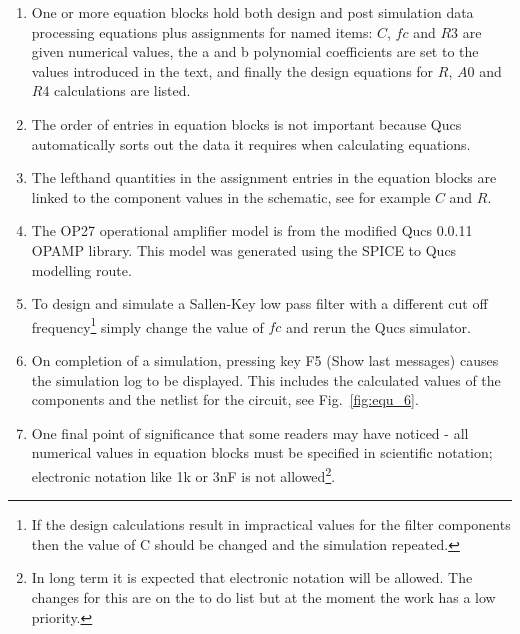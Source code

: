 \begin{enumerate}
  \item One or more equation blocks hold both design and post
  simulation data processing equations plus assignments for named
  items: $C$, $fc$ and $R3$ are given numerical values, the a and b
  polynomial coefficients are set to the values introduced in the
  text, and finally the design equations for $R$, $A0$ and $R4$
  calculations are listed.

  \item The order of entries in equation blocks is not important
  because Qucs automatically sorts out the data it requires when
  calculating equations.

  \item The lefthand quantities in the assignment entries in the
  equation blocks are linked to the component values in the schematic,
  see for example $C$ and $R$.

  \item The OP27 operational amplifier model is from the modified Qucs
  0.0.11 OPAMP library. This model was generated using the SPICE to
  Qucs modelling route.

  \item To design and simulate a Sallen-Key low pass filter with a
  different cut off frequency\footnote{If the design calculations
  result in impractical values for the filter components then the
  value of C should be changed and the simulation repeated.} simply
  change the value of $fc$ and rerun the Qucs simulator.

  \item On completion of a simulation, pressing key F5 (Show last
  messages) causes the simulation log to be displayed. This includes
  the calculated values of the components and the netlist for the
  circuit, see Fig.~\ref{fig:equ_6}.

  \item One final point of significance that some readers may have
  noticed - all numerical values in equation blocks must be specified
  in scientific notation; electronic notation like 1k or 3nF is not
  allowed\footnote{In long term it is expected that electronic
  notation will be allowed. The changes for this are on the to do list
  but at the moment the work has a low priority.}.
\end{enumerate}





